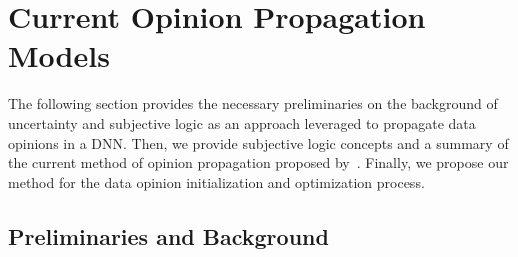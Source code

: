 

\section{Current Opinion Propagation Models}
\label{method}

The following section provides the necessary preliminaries on the background of uncertainty and subjective logic as an approach leveraged to propagate data opinions in a DNN. Then, we provide subjective logic concepts and a summary of the current method of opinion propagation proposed by~\cite{hope}. Finally, we propose our method for the data opinion initialization and optimization process.
 
\subsection{Preliminaries and Background}
\label{background}




